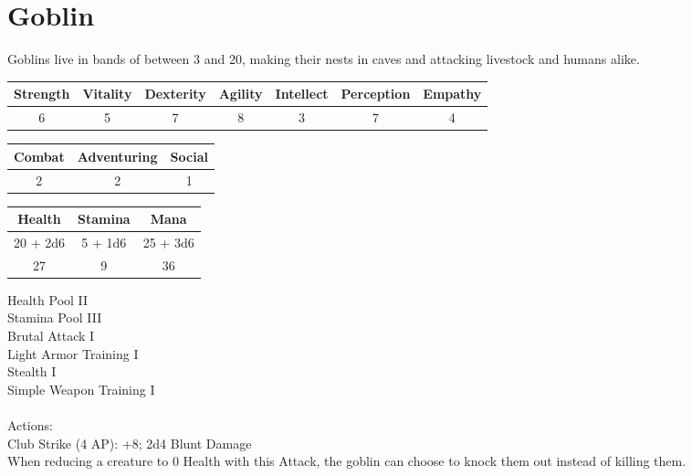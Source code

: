 \section{Goblin}

Goblins live in bands of between 3 and 20, making their nests in caves and attacking livestock and humans alike.

\begin{minipage}[H]{1\textwidth}
    \centering
    \begin{tabular}[c]{|c | c | c | c | c | c | c|}
        \hline
        Strength & Vitality & Dexterity & Agility & Intellect & Perception & Empathy\\
        \hline
        6 & 5 & 7 & 8 & 3 & 7 & 4\\
        \hline
    \end{tabular}
\end{minipage}
\begin{minipage}[H]{1\textwidth}
    \centering
    \begin{tabular}[c]{|c | c | c|}
        \hline
        Combat & Adventuring & Social\\
        \hline
        2 & 2 & 1\\
        \hline
    \end{tabular}
\end{minipage}
\begin{minipage}[H]{1\textwidth}
    \centering
    \begin{tabular}[c]{|c | c | c|}
        \hline
        Health & Stamina & Mana\\
        \hline
        20 + 2d6 & 5 + 1d6 & 25 + 3d6\\
        27 & 9 & 36\\
        \hline
    \end{tabular}
\end{minipage}
Health Pool II\\
Stamina Pool III\\
Brutal Attack I\\
Light Armor Training I\\
Stealth I\\
Simple Weapon Training I\\
\\
Actions:\\
Club Strike (4 AP): +8; 2d4 Blunt Damage\\
When reducing a creature to 0 Health with this Attack, the goblin can choose to knock them out instead of killing them.\\
